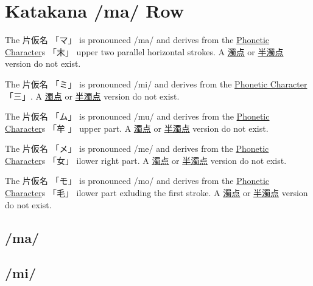 \section{Katakana /ma/ Row}\label{sec:KatakanaMaRow}


\label{letter:ma} The  片仮名 {「マ」} is pronounced  /ma/ and
derives from the \hyperref[sec:PhoneticCharacter]{Phonetic Character}s {「末」}
upper two parallel horizontal strokes.  A \hyperref[sec:Dakuten]{濁点} or
\hyperref[sec:Handakuten]{半濁点} version do not exist.

\label{letter:mi} The  片仮名 {「ミ」} is pronounced  /mi/ and
derives from the \hyperref[sec:PhoneticCharacter]{Phonetic Character} {「三」}.
A \hyperref[sec:Dakuten]{濁点} or \hyperref[sec:Handakuten]{半濁点} version do
not exist.

\label{letter:mu} The  片仮名 {「ム」} is pronounced  /mu/ and
derives from the \hyperref[sec:PhoneticCharacter]{Phonetic Character}s {「牟
」} upper part.  A \hyperref[sec:Dakuten]{濁点} or
\hyperref[sec:Handakuten]{半濁点} version do not exist.

\newpage

\label{letter:me} The  片仮名 {「メ」} is pronounced  /me/ and
derives from the \hyperref[sec:PhoneticCharacter]{Phonetic Character}s {「女」}
ilower right part.  A \hyperref[sec:Dakuten]{濁点} or
\hyperref[sec:Handakuten]{半濁点} version do not exist.



\label{letter:mo} The  片仮名 {「モ」} is pronounced  /mo/ and
derives from the \hyperref[sec:PhoneticCharacter]{Phonetic Character}s {「毛」}
ilower part exluding the first stroke.  A \hyperref[sec:Dakuten]{濁点} or
\hyperref[sec:Handakuten]{半濁点} version do not exist.

\newpage

\subsection{/ma/} \label{sec:KatakanaMa}


\subsection{/mi/} \label{sec:KatakanaMi}

